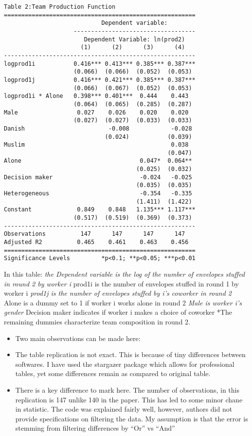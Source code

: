 \documentclass[
]{article}
\providecommand{\tightlist}{%
  \setlength{\itemsep}{0pt}\setlength{\parskip}{0pt}}
\begin{document}
\begin{verbatim}
Table 2:Team Production Function
=======================================================
                            Dependent variable:        
                    -----------------------------------
                       Dependent Variable: ln(prod2)   
                      (1)      (2)      (3)      (4)   
-------------------------------------------------------
logprod1i           0.416*** 0.413*** 0.385*** 0.387***
                    (0.066)  (0.066)  (0.052)  (0.053) 
logprod1j           0.416*** 0.421*** 0.385*** 0.387***
                    (0.066)  (0.067)  (0.052)  (0.053) 
logprod1i * Alone   0.398*** 0.401***  0.444    0.443  
                    (0.064)  (0.065)  (0.285)  (0.287) 
Male                 0.027    0.026    0.020    0.020  
                    (0.027)  (0.027)  (0.033)  (0.033) 
Danish                        -0.008            -0.028 
                             (0.024)           (0.039) 
Muslim                                          0.038  
                                               (0.047) 
Alone                                  0.047*  0.064** 
                                      (0.025)  (0.032) 
Decision maker                         -0.024   -0.025 
                                      (0.035)  (0.035) 
Heterogeneous                          -0.354   -0.335 
                                      (1.411)  (1.422) 
Constant             0.849    0.848   1.135*** 1.117***
                    (0.517)  (0.519)  (0.369)  (0.373) 
-------------------------------------------------------
Observations          147      147      147      147   
Adjusted R2          0.465    0.461    0.463    0.456  
=======================================================
Significance Levels         *p<0.1; **p<0.05; ***p<0.01
\end{verbatim}

In this table: \emph{the Dependent variable is the log of the number of
envelopes stuffed in round 2 by worker i }prod1i is the number of
envelopes stuffed in round 1 by worker i \emph{prod1j is the number of
envelopes stuffed by i's coworker in round 2 }Alone is a dummy set to 1
if worker i works alone in round 2 \emph{Male is worker i's gender
}Decision maker indicates if worker i makes a choice of coworker *The
remaining dummies characterize team composition in round 2.

\begin{itemize}
\tightlist
\item
  Two main observations can be made here:
\item
  The table replication is not exact. This is because of tiny
  differences between softwares. I have used the stargazer package which
  allows for professional tables, yet some differences remain as
  compared to original table.
\item
  There is a key difference to mark here. The number of observations, in
  this replication is 147 unlike 140 in the paper. This has led to some
  minor chane in statistic. The code was explained fairly well, however,
  authors did not provide specifications on filtering the data. My
  assumption is that the error is stemming from filtering differences by
  ``Or'' vs ``And''
\end{itemize}
\end{document}
